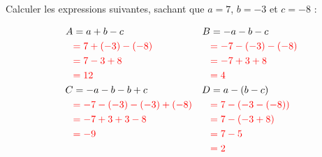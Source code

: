\documentclass[Controlev2-correction]{subfiles}
\begin{document}
\begin{exercice}[(6 points)]

	Calculer les expressions suivantes, sachant que $a = 7$, $b = -3$ et $c = -8$ :

	\begin{align*}
		A & = a + b - c                            & B & = -a - b - c                    \\
		  & \correction{= 7 + (-3) - (-8)}         &   & \correction{= -7 - (-3) - (-8)} \\
		  & \correction{= 7 - 3 + 8}               &   & \correction{= -7 + 3 + 8}       \\
		  & \correction{= 12}                      &   & \correction{= 4}                \\
		C & = -a - b - b + c                       & D & = a - (b - c)                   \\
		  & \correction{= -7 - (-3) - (-3) + (-8)} &   & \correction{= 7 - (-3 - (-8))}  \\
		  & \correction{= -7 + 3 + 3 - 8}          &   & \correction{= 7 - (-3 + 8)}     \\
		  & \correction{= -9}                      &   & \correction{= 7 - 5}            \\
		  &                                        &   & \correction{= 2}                \\
	\end{align*}
\end{exercice}
\end{document}
